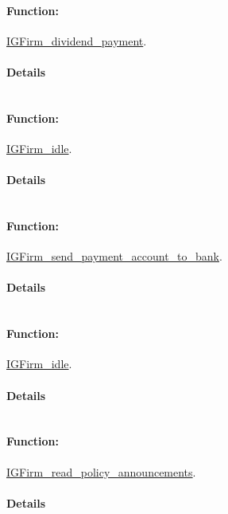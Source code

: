 \documentclass[a4paper,11pt]{article}
\begin{document}
\paragraph{Function:}\url{IGFirm_dividend_payment}.

\paragraph{Details}
\begin{verbatim}
\end{verbatim}
\paragraph{Function:}\url{IGFirm_idle}.

\paragraph{Details}
\begin{verbatim}
\end{verbatim}
\paragraph{Function:}\url{IGFirm_send_payment_account_to_bank}.

\paragraph{Details}
\begin{verbatim}
\end{verbatim}
\paragraph{Function:}\url{IGFirm_idle}.

\paragraph{Details}
\begin{verbatim}
\end{verbatim}
\paragraph{Function:}\url{IGFirm_read_policy_announcements}.

\paragraph{Details}
\begin{verbatim}
\end{verbatim}
\end{document}
